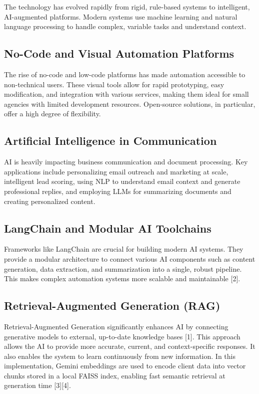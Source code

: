 \documentclass[12pt,a4paper]{report}
\begin{document}
The technology has evolved rapidly from rigid, rule-based systems to intelligent, AI-augmented platforms. Modern systems use machine learning and natural language processing to handle complex, variable tasks and understand context.

\subsection{No-Code and Visual Automation Platforms}
The rise of no-code and low-code platforms has made automation accessible to non-technical users. These visual tools allow for rapid prototyping, easy modification, and integration with various services, making them ideal for small agencies with limited development resources. Open-source solutions, in particular, offer a high degree of flexibility.

\subsection{Artificial Intelligence in Communication}
AI is heavily impacting business communication and document processing. Key applications include personalizing email outreach and marketing at scale, intelligent lead scoring, using NLP to understand email context and generate professional replies, and employing LLMs for summarizing documents and creating personalized content.

\subsection{LangChain and Modular AI Toolchains}
Frameworks like LangChain are crucial for building modern AI systems. They provide a modular architecture to connect various AI components such as content generation, data extraction, and summarization into a single, robust pipeline. This makes complex automation systems more scalable and maintainable [2].

\subsection{Retrieval-Augmented Generation (RAG)}
Retrieval-Augmented Generation significantly enhances AI by connecting generative models to external, up-to-date knowledge bases [1]. This approach allows the AI to provide more accurate, current, and context-specific responses. It also enables the system to learn continuously from new information. In this implementation, Gemini embeddings are used to encode client data into vector chunks stored in a local FAISS index, enabling fast semantic retrieval at generation time [3][4].
\end{document}
